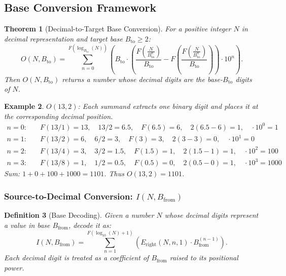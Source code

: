 \documentclass[12pt, a4paper]{article}
\theoremstyle{note}
\newtheorem{theorem}{Theorem}[section]
\newtheorem{definition}[theorem]{Definition}
\newtheorem{example}[theorem]{Example}
\begin{document}
\subsection{Base Conversion Framework}

\begin{theorem}[Decimal-to-Target Base Conversion]\label{thm:encode}
For a positive integer $N$ in decimal representation and target base $B_{\text{to}} \geq 2$:
\[
O(N, B_{\text{to}}) = \sum_{n=0}^{F(\log_{B_{\text{to}}}(N))}\left(B_{\text{to}} \cdot \left(\frac{F\!\left(\frac{N}{B_{\text{to}}^{n}}\right)}{B_{\text{to}}} - F\!\left(\frac{F\!\left(\frac{N}{B_{\text{to}}^{n}}\right)}{B_{\text{to}}}\right)\right) \cdot 10^{n}\right).
\]
Then $O(N, B_{\text{to}})$ returns a number whose decimal digits are the base-$B_{\text{to}}$ digits of $N$.
\end{theorem}

\begin{example}
$O(13, 2)$: Each summand extracts one binary digit and places it at the corresponding decimal position.
\begin{align*}
n=0: &\quad F(13/1) = 13, \quad 13/2 = 6.5, \quad F(6.5) = 6, \quad 2(6.5 - 6) = 1, \quad \cdot 10^0 = 1 \\
n=1: &\quad F(13/2) = 6, \quad 6/2 = 3, \quad F(3) = 3, \quad 2(3 - 3) = 0, \quad \cdot 10^1 = 0 \\
n=2: &\quad F(13/4) = 3, \quad 3/2 = 1.5, \quad F(1.5) = 1, \quad 2(1.5 - 1) = 1, \quad \cdot 10^2 = 100 \\
n=3: &\quad F(13/8) = 1, \quad 1/2 = 0.5, \quad F(0.5) = 0, \quad 2(0.5 - 0) = 1, \quad \cdot 10^3 = 1000
\end{align*}
Sum: $1 + 0 + 100 + 1000 = 1101$. Thus $O(13, 2) = 1101$.
\end{example}

\subsubsection{Source-to-Decimal Conversion: $I(N, B_{\text{from}})$}

\begin{definition}[Base Decoding]\label{def:decode}
Given a number $N$ whose decimal digits represent a value in base $B_{\text{from}}$, decode it as:
\[
I(N, B_{\text{from}}) = \sum_{n=1}^{F(\log_{10}(N) + 1)} \left(E_{\text{right}}(N, n, 1) \cdot B_{\text{from}}^{(n-1)}\right).
\]
Each decimal digit is treated as a coefficient of $B_{\text{from}}$ raised to its positional power.
\end{definition}
\end{document}
